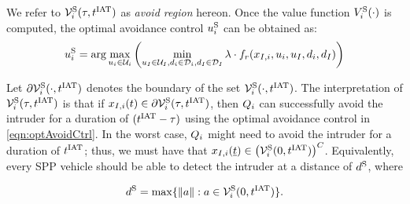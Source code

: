 We refer to $\mathcal{V}^{\text{S}}_i(\tau, t^\text{IAT})$ as \textit{avoid region} hereon. Once the value function $V^{\text{S}}_{i}(\cdot)$ is computed, the optimal avoidance control ${u^{\text{S}}_{i}}$ can be obtained as:
\begin{equation} \label{eqn:optAvoidCtrl}
{\ctrl^{\text{S}}_{i}} = \arg \max_{\ctrl_i \in \cset_i} \left( \min_{\ctrl_\intr \in \cset_\intr, \dstb_i \in \dset_i, \dstb_\intr \in \dset_\intr} \costate \cdot f_r(\state_{\intr, i}, \ctrl_i, \ctrl_\intr, \dstb_i, \dstb_\intr) \right)
\end{equation}

Let $\partial \mathcal{V}^{\text{S}}_{i}(\cdot, t^\text{IAT})$ denotes the boundary of the set $\mathcal{V}^{\text{S}}_{i}(\cdot, t^\text{IAT})$. The interpretation of $\mathcal{V}^{\text{S}}_{i}(\tau, t^\text{IAT})$ is that if $x_{I, i}(t) \in \partial \mathcal{V}^{\text{S}}_{i}(\tau, t^\text{IAT})$, then $Q_i$ can successfully avoid the intruder for a duration of $(t^\text{IAT} - \tau)$ using the optimal avoidance control in \eqref{eqn:optAvoidCtrl}. In the worst case, $Q_i$ might need to avoid the intruder for a duration of $t^\text{IAT}$; thus, we must have that  
$x_{I, i}(\underline{t}) \in \left(\mathcal{V}^{\text{S}}_{i}(0, t^\text{IAT})\right)^C$. Equivalently, every SPP vehicle should be able to detect the intruder at a distance of $d^\text{S}$, where

\begin{equation} \label{eqn:sen_distance}
\dsen = \max\{ \|a\|: a \in \brs^{\text{S}}_{i}(0, \iat) \}.
\end{equation} 

